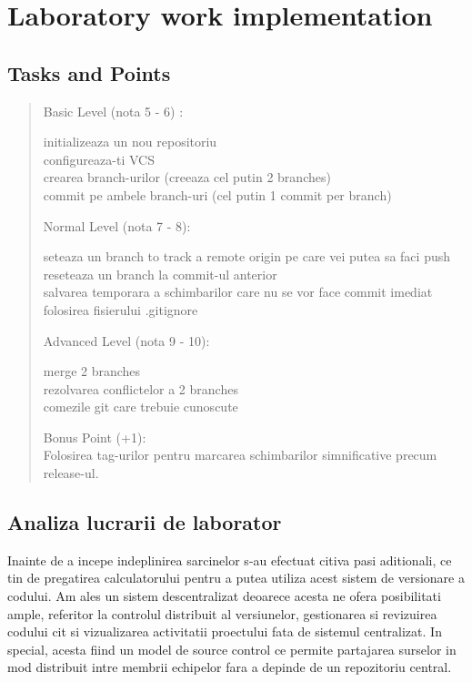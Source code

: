 \section{Laboratory work implementation}

\subsection{Tasks and Points}

\begin{quote}
\begin{description}

	\item Basic Level (nota 5 - 6) :
	
	initializeaza un nou repositoriu \\
	configureaza-ti VCS\\
	crearea branch-urilor (creeaza cel putin 2 branches)\\
	commit pe ambele branch-uri (cel putin 1 commit per branch)

	\item Normal Level (nota 7 - 8):
	
	seteaza un branch to track a remote origin pe care vei putea sa faci push\\
	reseteaza un branch la commit-ul anterior\\
	salvarea temporara a schimbarilor care nu se vor face commit imediat\\
	folosirea fisierului .gitignore
	
	\item Advanced Level (nota 9 - 10):
	
	merge 2 branches\\
	rezolvarea conflictelor a 2 branches\\
	comezile git care trebuie cunoscute
	\item Bonus Point (+1):\\
	Folosirea tag-urilor pentru marcarea schimbarilor simnificative precum release-ul.

\end{description}
\end{quote}

\subsection{Analiza lucrarii de laborator}

Inainte de a incepe indeplinirea sarcinelor s-au efectuat citiva pasi aditionali, ce tin de pregatirea calculatorului pentru a putea utiliza acest sistem de versionare a codului. Am ales un sistem descentralizat deoarece acesta ne ofera posibilitati ample, referitor la controlul distribuit al versiunelor, gestionarea si revizuirea codului cit si vizualizarea activitatii proectului fata de sistemul centralizat. In special, acesta fiind un model de source control ce permite partajarea surselor in mod distribuit intre membrii echipelor fara a depinde de un repozitoriu central.


